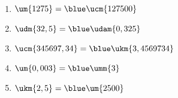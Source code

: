    \ \\ [-5mm]
   \begin{enumerate}
      \item $\um{1275} =\blue\ucm{127500}$
      \item $\udm{32,5} =\blue\udam{0,325}$
      \item $\ucm{345697,34} =\blue\ukm{3,4569734}$
      \item $\um{0,003} =\blue\umm{3}$
      \item $\ukm{2,5} =\blue\um{2500}$
   \end{enumerate}
